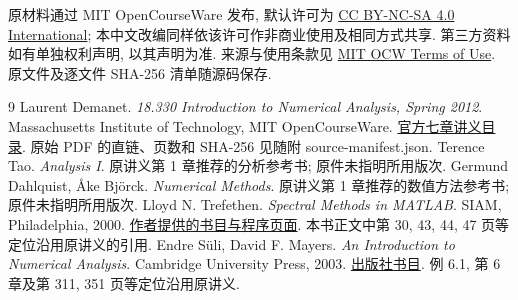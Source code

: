 原材料通过 MIT OpenCourseWare 发布, 默认许可为 \href{https://creativecommons.org/licenses/by-nc-sa/4.0/}{CC BY-NC-SA 4.0 International}; 本中文改编同样依该许可作非商业使用及相同方式共享. 第三方资料如有单独权利声明, 以其声明为准. 来源与使用条款见 \href{https://ocw.mit.edu/pages/privacy-and-terms-of-use/}{MIT OCW Terms of Use}. 原文件及逐文件 SHA-256 清单随源码保存.
\clearpage

\clearpage
\originalcontents
\clearpage
\mainmatter















\begin{thebibliography}{9}
 Laurent Demanet. \textit{18.330 Introduction to Numerical Analysis, Spring 2012}. Massachusetts Institute of Technology, MIT OpenCourseWare. \href{https://ocw.mit.edu/courses/18-330-introduction-to-numerical-analysis-spring-2012/pages/lecture-notes/}{官方七章讲义目录}. 原始 PDF 的直链、页数和 SHA-256 见随附 source-manifest.json.
 Terence Tao. \textit{Analysis I}. 原讲义第 1 章推荐的分析参考书; 原件未指明所用版次.
 Germund Dahlquist, Åke Björck. \textit{Numerical Methods}. 原讲义第 1 章推荐的数值方法参考书; 原件未指明所用版次.
 Lloyd N. Trefethen. \textit{Spectral Methods in MATLAB}. SIAM, Philadelphia, 2000. \href{https://people.maths.ox.ac.uk/trefethen/spectral.html}{作者提供的书目与程序页面}. 本书正文中第 30, 43, 44, 47 页等定位沿用原讲义的引用.
 Endre Süli, David F. Mayers. \textit{An Introduction to Numerical Analysis}. Cambridge University Press, 2003. \href{https://doi.org/10.1017/CBO9780511801181}{出版社书目}. 例 6.1, 第 6 章及第 311, 351 页等定位沿用原讲义.
\end{thebibliography}

